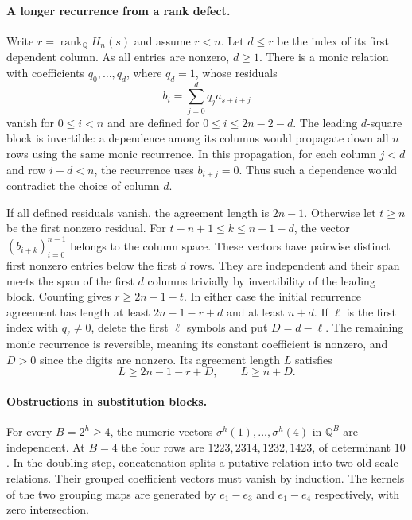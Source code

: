 \documentclass[10pt]{article}
\newcommand{\rank}{\operatorname{rank}}
\begin{document}
\paragraph{A longer recurrence from a rank defect.}
Write \(r=\rank_{\mathbb Q} H_n(s)\) and assume \(r<n\). Let \(d\le r\) be the index of its first dependent column. As all entries are nonzero, \(d\ge1\). There is a monic relation with coefficients \(q_0,\ldots,q_d\), where \(q_d=1\), whose residuals
\[
 b_i=\sum_{j=0}^d q_j a_{s+i+j}
\]
vanish for \(0\le i<n\) and are defined for \(0\le i\le2n-2-d\). The leading \(d\)-square block is invertible: a dependence among its columns would propagate down all \(n\) rows using the same monic recurrence. In this propagation, for each column \(j<d\) and row \(i+d<n\), the recurrence uses \(b_{i+j}=0\). Thus such a dependence would contradict the choice of column \(d\).

If all defined residuals vanish, the agreement length is \(2n-1\). Otherwise let \(t\ge n\) be the first nonzero residual. For \(t-n+1\le k\le n-1-d\), the vector \((b_{i+k})_{i=0}^{n-1}\) belongs to the column space. These vectors have pairwise distinct first nonzero entries below the first \(d\) rows. They are independent and their span meets the span of the first \(d\) columns trivially by invertibility of the leading block. Counting gives \(r\ge2n-1-t\). In either case the initial recurrence agreement has length at least \(2n-1-r+d\) and at least \(n+d\). If \(\ell\) is the first index with \(q_\ell\ne0\), delete the first \(\ell\) symbols and put \(D=d-\ell\). The remaining monic recurrence is reversible, meaning its constant coefficient is nonzero, and \(D>0\) since the digits are nonzero. Its agreement length \(L\) satisfies
\begin{equation}\label{length}
 L\ge2n-1-r+D,\qquad L\ge n+D.
\end{equation}

\paragraph{Obstructions in substitution blocks.}
For every \(B=2^h\ge4\), the numeric vectors \(\sigma^h(1),\dots,\sigma^h(4)\) in \(\mathbb Q^B\) are independent. At \(B=4\) the four rows are \(1223,2314,1232,1423\), of determinant \(10\). In the doubling step, concatenation splits a putative relation into two old-scale relations. Their grouped coefficient vectors must vanish by induction. The kernels of the two grouping maps are generated by \(e_1-e_3\) and \(e_1-e_4\) respectively, with zero intersection.
\end{document}
